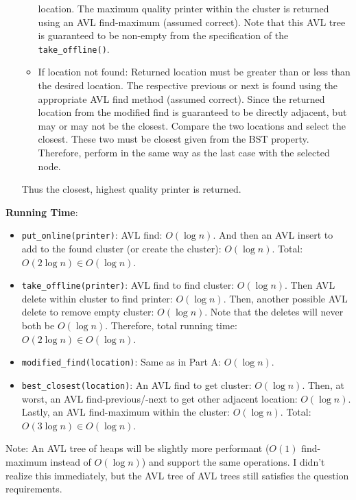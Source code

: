 \documentclass[12pt,twoside]{article}
\begin{document}
\begin{problems}
\begin{problemparts}
\begin{itemize}
\begin{itemize}
            location. The maximum quality printer within the cluster is
            returned using an AVL find-maximum (assumed correct). Note that
            this AVL tree is guaranteed to be non-empty from the
            specification of the {\tt take\_offline()}.
            \item If location not found: Returned location must be greater
            than or less than the desired location. The respective previous
            or next is found using the appropriate AVL find method (assumed
            correct). Since the returned location from the modified find is
            guaranteed to be directly adjacent, but may or may not be the
            closest. Compare the two locations and select the closest. These
            two must be closest given from the BST property. Therefore,
            perform in the same way as the last case with the selected node.
        \end{itemize}
        Thus the closest, highest quality printer is returned.
    \end{itemize}

    \smallbreak

    {\bf Running Time}: \begin{itemize}
        \item {\tt put\_online(printer)}: AVL find: $ O(\log n) $. And then
        an AVL insert to add to the found cluster (or create the cluster): $
        O(\log n) $. Total: $ O(2 \log n) \in O(\log n) $.
        \item {\tt take\_offline(printer)}: AVL find to find cluster: $
        O(\log n) $. Then AVL delete within cluster to find printer: $ O(\log
        n) $. Then, another possible AVL delete to remove empty cluster: $
        O(\log n) $. Note that the deletes will never both be $ O(\log n) $.
        Therefore, total running time: $ O(2 \log n) \in O(\log n) $.
        \item {\tt modified\_find(location)}: Same as in Part A: $ O(\log n) $.
        \item {\tt best\_closest(location)}: An AVL find to get cluster: $
        O(\log n) $. Then, at worst, an AVL find-previous/-next to get other
        adjacent location: $ O(\log n) $. Lastly, an AVL find-maximum within
        the cluster: $ O(\log n) $. Total: $ O(3 \log n) \in O(\log n) $.
    \end{itemize}

    Note: An AVL tree of heaps will be slightly more performant ($ O(1) $
    find-maximum instead of $ O(\log n) $) and support the same operations. I
    didn't realize this immediately, but the AVL tree of AVL trees still
    satisfies the question requirements.


\end{problemparts}
\end{problems}
\end{document}
